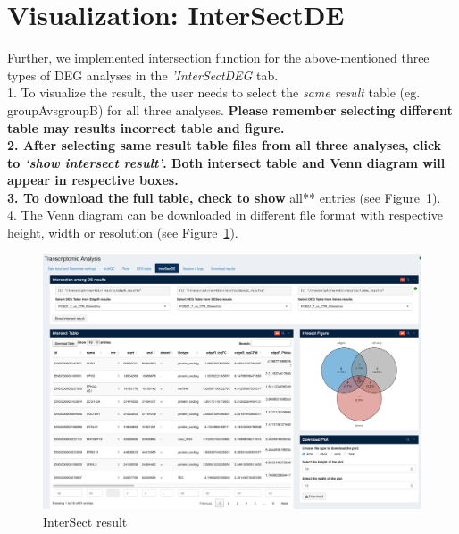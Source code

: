 \documentclass[
  a4paper,
  oneside,
  open=any]{scrreport}
\begin{document}
\hypertarget{visualization-intersectde}{%
\section{Visualization: InterSectDE}\label{visualization-intersectde}}

Further, we implemented intersection function for the above-mentioned
three types of DEG analyses in the \emph{'InterSectDEG} tab.\\
1. To visualize the result, the user needs to select the \emph{same
result} table (eg. groupAvsgroupB) for all three analyses.
\textbf{Please remember selecting different table may results incorrect
table and figure.\\
2. After selecting same result table files from all three analyses,
click to \emph{`show intersect result'}. Both intersect table and Venn
diagram will appear in respective boxes.\\
3. To download the full table, check to show }all** entries (see
Figure~\ref{fig-trans9}).\\
4. The Venn diagram can be downloaded in different file format with
respective height, width or resolution (see Figure~\ref{fig-trans9}).

\begin{figure}[H]

{\centering \includegraphics{./images/transcriptome/transcript10.png}

}

\caption{\label{fig-trans9}InterSect result}

\end{figure}
\end{document}
